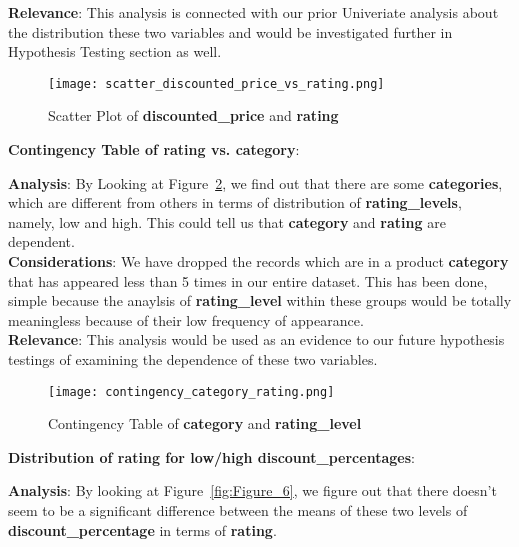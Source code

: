 \documentclass[a4paper,12pt]{article}
\begin{document}
\noindent\textbf{Relevance}: This analysis is connected with our prior Univeriate analysis about the distribution these two variables and would be investigated further in Hypothesis Testing section as well. \\

\begin{figure}[H]
    \centering
    \texttt{[image: scatter\_discounted\_price\_vs\_rating.png]} %
    \caption{Scatter Plot of \textbf{discounted\_price} and \textbf{rating}}
    \label{fig:Figure_4}
\end{figure}

\noindent\textbf{Contingency Table of rating vs. category}:

\noindent\textbf{Analysis}: By Looking at Figure~\ref{fig:Figure_5}, we find out that there are some \textbf{categories}, which are different from others in terms of distribution of \textbf{rating\_levels}, namely, low and high. This could tell us that \textbf{category} and \textbf{rating} are dependent. \\ 

\noindent\textbf{Considerations}: We have dropped the records which are in a product \textbf{category} that has appeared less than 5 times in our entire dataset. This has been done, simple because the anaylsis of \textbf{rating\_level} within these groups would be totally meaningless because of their low frequency of appearance. \\ 

\noindent\textbf{Relevance}: This analysis would be used as an evidence to our future hypothesis testings of examining the dependence of these two variables.\\

\begin{figure}[H]
    \centering
    \texttt{[image: contingency\_category\_rating.png]} %
    \caption{Contingency Table of \textbf{category} and \textbf{rating\_level}}
    \label{fig:Figure_5}
\end{figure}

\noindent\textbf{Distribution of rating for low/high discount\_percentages}:

\noindent\textbf{Analysis}: By looking at Figure~\ref{fig:Figure_6}, we figure out that there doesn't seem to be a significant difference between the means of these two levels of \textbf{discount\_percentage} in terms of \textbf{rating}. \\ 
\end{document}
